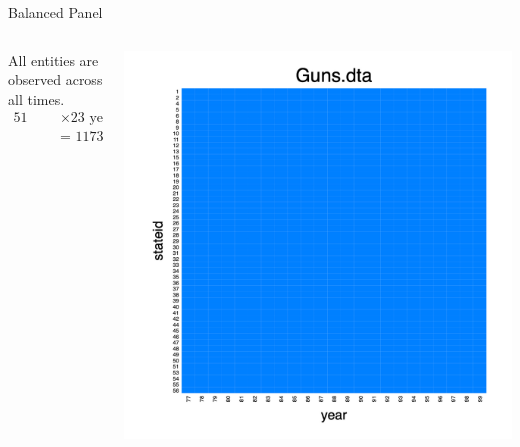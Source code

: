 \documentclass[
  10pt,
  ignorenonframetext,
]{beamer}
\begin{document}
\begin{frame}{Balanced Panel}
\protect\hypertarget{balanced-panel}{}
\begin{columns}[T]
\begin{column}{.3\textwidth}
\vspace{2cm}

\small

All entities are observed across all times. \[
\begin{aligned}
\text{51 states} &\times \text{23 years}\\
&\text{= 1173 observations}
\end{aligned}
\]
\end{column}

\begin{column}{0.48\textwidth}
\begin{flushright}\includegraphics[width=1.25\linewidth]{pictures/Q1-panelView-balanced} \end{flushright}
\end{column}
\end{columns}
\end{frame}
\end{document}
